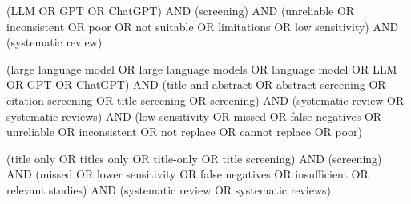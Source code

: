 \begin{description}[style=nextline,font=\normalfont\bfseries]
\item[q4x, counter query] {\footnotesize\ttfamily\raggedright (LLM OR GPT OR ChatGPT) AND (screening) AND (unreliable OR inconsistent OR poor OR \textquotedbl{}not suitable\textquotedbl{} OR limitations OR \textquotedbl{}low sensitivity\textquotedbl{}) AND (\textquotedbl{}systematic review\textquotedbl{})\par}
\item[q4y, counter query] {\footnotesize\ttfamily\raggedright (\textquotedbl{}large language model\textquotedbl{} OR \textquotedbl{}large language models\textquotedbl{} OR \textquotedbl{}language model\textquotedbl{} OR LLM OR GPT OR ChatGPT) AND (\textquotedbl{}title and abstract\textquotedbl{} OR \textquotedbl{}abstract screening\textquotedbl{} OR \textquotedbl{}citation screening\textquotedbl{} OR \textquotedbl{}title screening\textquotedbl{} OR screening) AND (\textquotedbl{}systematic review\textquotedbl{} OR \textquotedbl{}systematic reviews\textquotedbl{}) AND (\textquotedbl{}low sensitivity\textquotedbl{} OR missed OR \textquotedbl{}false negatives\textquotedbl{} OR unreliable OR inconsistent OR \textquotedbl{}not replace\textquotedbl{} OR \textquotedbl{}cannot replace\textquotedbl{} OR poor)\par}
\item[q4z, counter query] {\footnotesize\ttfamily\raggedright (\textquotedbl{}title only\textquotedbl{} OR \textquotedbl{}titles only\textquotedbl{} OR \textquotedbl{}title-only\textquotedbl{} OR \textquotedbl{}title screening\textquotedbl{}) AND (screening) AND (missed OR \textquotedbl{}lower sensitivity\textquotedbl{} OR \textquotedbl{}false negatives\textquotedbl{} OR insufficient OR \textquotedbl{}relevant studies\textquotedbl{}) AND (\textquotedbl{}systematic review\textquotedbl{} OR \textquotedbl{}systematic reviews\textquotedbl{})\par}
\end{description}
